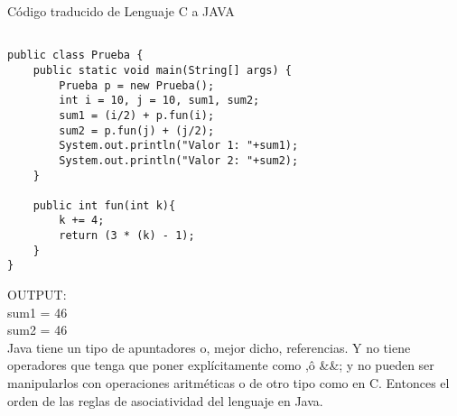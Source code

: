 \lstset{language = java}  %
Código traducido de Lenguaje C a JAVA
\begin{lstlisting}[frame = single] %Comienzo del Código

public class Prueba {
    public static void main(String[] args) {
        Prueba p = new Prueba();
        int i = 10, j = 10, sum1, sum2;
        sum1 = (i/2) + p.fun(i);
        sum2 = p.fun(j) + (j/2);
        System.out.println("Valor 1: "+sum1);
        System.out.println("Valor 2: "+sum2);
    }

    public int fun(int k){
        k += 4;
        return (3 * (k) - 1);
    }
}
\end{lstlisting}
OUTPUT:\\
	sum1 =  46\\
	sum2 =  46\\
Java tiene un tipo de apuntadores o, mejor dicho, referencias. Y no tiene operadores que tenga que poner explícitamente como \*,\^ o \&\&; y no pueden ser manipularlos con operaciones aritméticas o de otro tipo como en C.
Entonces el orden de las reglas de asociatividad del lenguaje en Java.\\